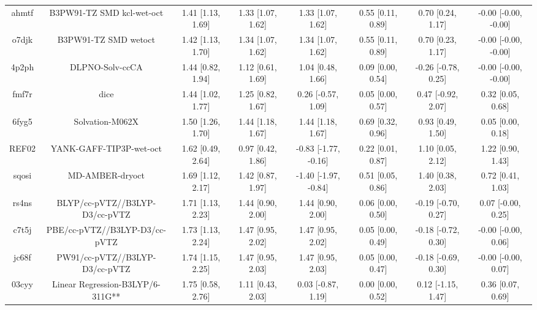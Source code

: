 \documentclass{article}
\begin{document}
\begin{center}
\begin{longtable}{|cccccccc|}
 ahmtf &                          B3PW91-TZ SMD kcl-wet-oct &  1.41 [1.13, 1.69] &  1.33 [1.07, 1.62] &     1.33 [1.07, 1.62] &  0.55 [0.11, 0.89] &    0.70 [0.24, 1.17] &  -0.00 [-0.00, -0.00] \\
 o7djk &                               B3PW91-TZ SMD wetoct &  1.42 [1.13, 1.70] &  1.34 [1.07, 1.62] &     1.34 [1.07, 1.62] &  0.55 [0.11, 0.89] &    0.70 [0.23, 1.17] &  -0.00 [-0.00, -0.00] \\
 4p2ph &                                    DLPNO-Solv-ccCA &  1.44 [0.82, 1.94] &  1.12 [0.61, 1.69] &     1.04 [0.48, 1.66] &  0.09 [0.00, 0.54] &  -0.26 [-0.78, 0.25] &  -0.00 [-0.00, -0.00] \\
 fmf7r &                                               dice &  1.44 [1.02, 1.77] &  1.25 [0.82, 1.67] &    0.26 [-0.57, 1.09] &  0.05 [0.00, 0.57] &   0.47 [-0.92, 2.07] &     0.32 [0.05, 0.68] \\
 6fyg5 &                                    Solvation-M062X &  1.50 [1.26, 1.70] &  1.44 [1.18, 1.67] &     1.44 [1.18, 1.67] &  0.69 [0.32, 0.96] &    0.93 [0.49, 1.50] &     0.05 [0.00, 0.18] \\
 REF02 &                            YANK-GAFF-TIP3P-wet-oct &  1.62 [0.49, 2.64] &  0.97 [0.42, 1.86] &  -0.83 [-1.77, -0.16] &  0.22 [0.01, 0.87] &    1.10 [0.05, 2.12] &     1.22 [0.90, 1.43] \\
 sqosi &                                    MD-AMBER-dryoct &  1.69 [1.12, 2.17] &  1.42 [0.87, 1.97] &  -1.40 [-1.97, -0.84] &  0.51 [0.05, 0.86] &    1.40 [0.38, 2.03] &     0.72 [0.41, 1.03] \\
 rs4ns &                     BLYP/cc-pVTZ//B3LYP-D3/cc-pVTZ &  1.71 [1.13, 2.23] &  1.44 [0.90, 2.00] &     1.44 [0.90, 2.00] &  0.06 [0.00, 0.50] &  -0.19 [-0.70, 0.27] &    0.07 [-0.00, 0.25] \\
 c7t5j &                      PBE/cc-pVTZ//B3LYP-D3/cc-pVTZ &  1.73 [1.13, 2.24] &  1.47 [0.95, 2.02] &     1.47 [0.95, 2.02] &  0.05 [0.00, 0.49] &  -0.18 [-0.72, 0.30] &   -0.00 [-0.00, 0.06] \\
 jc68f &                     PW91/cc-pVTZ//B3LYP-D3/cc-pVTZ &  1.74 [1.15, 2.25] &  1.47 [0.95, 2.03] &     1.47 [0.95, 2.03] &  0.05 [0.00, 0.47] &  -0.18 [-0.69, 0.30] &   -0.00 [-0.00, 0.07] \\
 03cyy &                   Linear Regression-B3LYP/6-311G** &  1.75 [0.58, 2.76] &  1.11 [0.43, 2.03] &    0.03 [-0.87, 1.19] &  0.00 [0.00, 0.52] &   0.12 [-1.15, 1.47] &     0.36 [0.07, 0.69] \\

\end{longtable}
\end{center}
\end{document}

